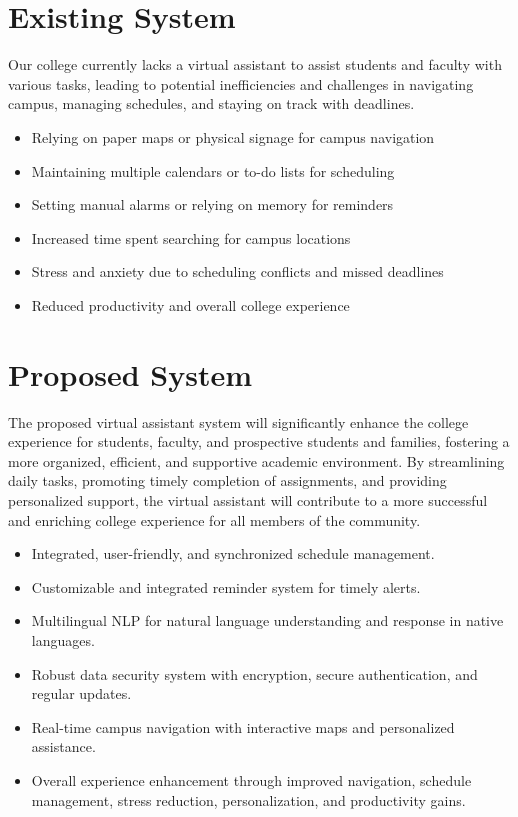 \documentclass[12pt,a4paper]{report}
\begin{document}
\section{Existing System}
Our college currently lacks a virtual assistant to assist students and faculty with various tasks, leading to potential inefficiencies and challenges in navigating campus, managing schedules, and staying on track with deadlines.

\begin{itemize}
	\item Relying on paper maps or physical signage for campus navigation
	\item Maintaining multiple calendars or to-do lists for scheduling
	\item Setting manual alarms or relying on memory for reminders
	\item Increased time spent searching for campus locations
	\item Stress and anxiety due to scheduling conflicts and missed deadlines
	\item Reduced productivity and overall college experience
\end{itemize}

\newpage
\section{Proposed System}
The proposed virtual assistant system will significantly enhance the college experience for students, faculty, and prospective students and families, fostering a more organized, efficient, and supportive academic environment. By streamlining daily tasks, promoting timely completion of assignments, and providing personalized support, the virtual assistant will contribute to a more successful and enriching college experience for all members of the community.
\begin{itemize}
	\item Integrated, user-friendly, and synchronized schedule management.
	\item Customizable and integrated reminder system for timely alerts.
	\item Multilingual NLP for natural language understanding and response in native languages.
	\item Robust data security system with encryption, secure authentication, and regular updates.
	\item Real-time campus navigation with interactive maps and personalized assistance.
	\item Overall experience enhancement through improved navigation, schedule management, stress reduction, personalization, and productivity gains.
\end{itemize}
\end{document}
